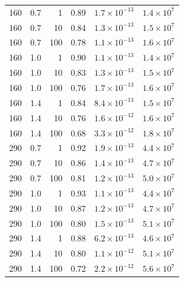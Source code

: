 \begin{tabular}{rrrrrr}
160 & 0.7 & 1 & 0.89 & $\ensuremath{1.7\times10^{-13}}$ & $\ensuremath{1.4\times10^{7}}$ \\
160 & 0.7 & 10 & 0.84 & $\ensuremath{1.3\times10^{-13}}$ & $\ensuremath{1.5\times10^{7}}$ \\
160 & 0.7 & 100 & 0.78 & $\ensuremath{1.1\times10^{-13}}$ & $\ensuremath{1.6\times10^{7}}$ \\
160 & 1.0 & 1 & 0.90 & $\ensuremath{1.1\times10^{-13}}$ & $\ensuremath{1.4\times10^{7}}$ \\
160 & 1.0 & 10 & 0.83 & $\ensuremath{1.3\times10^{-13}}$ & $\ensuremath{1.5\times10^{7}}$ \\
160 & 1.0 & 100 & 0.76 & $\ensuremath{1.7\times10^{-13}}$ & $\ensuremath{1.6\times10^{7}}$ \\
160 & 1.4 & 1 & 0.84 & $\ensuremath{8.4\times10^{-13}}$ & $\ensuremath{1.5\times10^{7}}$ \\
160 & 1.4 & 10 & 0.76 & $\ensuremath{1.6\times10^{-12}}$ & $\ensuremath{1.6\times10^{7}}$ \\
160 & 1.4 & 100 & 0.68 & $\ensuremath{3.3\times10^{-12}}$ & $\ensuremath{1.8\times10^{7}}$ \\
290 & 0.7 & 1 & 0.92 & $\ensuremath{1.9\times10^{-13}}$ & $\ensuremath{4.4\times10^{7}}$ \\
290 & 0.7 & 10 & 0.86 & $\ensuremath{1.4\times10^{-13}}$ & $\ensuremath{4.7\times10^{7}}$ \\
290 & 0.7 & 100 & 0.81 & $\ensuremath{1.2\times10^{-13}}$ & $\ensuremath{5.0\times10^{7}}$ \\
290 & 1.0 & 1 & 0.93 & $\ensuremath{1.1\times10^{-13}}$ & $\ensuremath{4.4\times10^{7}}$ \\
290 & 1.0 & 10 & 0.87 & $\ensuremath{1.2\times10^{-13}}$ & $\ensuremath{4.7\times10^{7}}$ \\
290 & 1.0 & 100 & 0.80 & $\ensuremath{1.5\times10^{-13}}$ & $\ensuremath{5.1\times10^{7}}$ \\
290 & 1.4 & 1 & 0.88 & $\ensuremath{6.2\times10^{-13}}$ & $\ensuremath{4.6\times10^{7}}$ \\
290 & 1.4 & 10 & 0.80 & $\ensuremath{1.1\times10^{-12}}$ & $\ensuremath{5.1\times10^{7}}$ \\
290 & 1.4 & 100 & 0.72 & $\ensuremath{2.2\times10^{-12}}$ & $\ensuremath{5.6\times10^{7}}$ \\
\bottomrule
\end{tabular}
